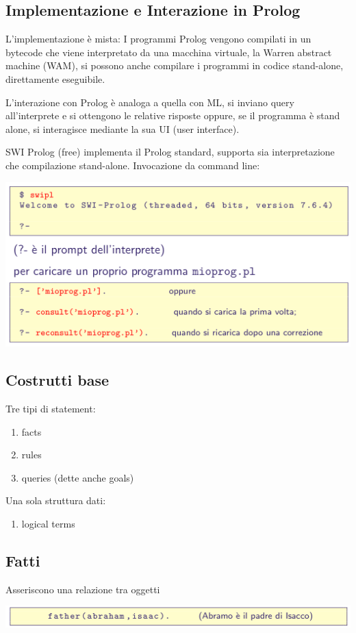 \documentclass[10pt]{article}
\begin{document}
\subsection{Implementazione e Interazione in Prolog}
L’implementazione è mista: I programmi Prolog vengono compilati in un bytecode
che viene interpretato da una macchina virtuale,
la Warren abstract machine (WAM),
si possono anche compilare i programmi in codice
stand-alone, direttamente eseguibile.

L’interazione con Prolog è analoga a quella con ML, si inviano query all’interprete e si ottengono le relative risposte
oppure, se il programma è stand alone, si interagisce
mediante la sua UI (user interface).

SWI Prolog (free) implementa il Prolog standard,
supporta sia interpretazione che compilazione stand-alone.
Invocazione da command line:

\includegraphics[scale=0.2]{Immagini/prolog1.png}
\subsection{Costrutti base}
Tre tipi di statement:
\begin{enumerate}
    \item facts
    \item rules
    \item queries (dette anche goals)
\end{enumerate}
Una sola struttura dati:
\begin{enumerate}
    \item logical terms
\end{enumerate}
\subsection{Fatti}
Asseriscono una relazione tra oggetti

\includegraphics[scale=0.2]{Immagini/prolog2.png}
\end{document}
